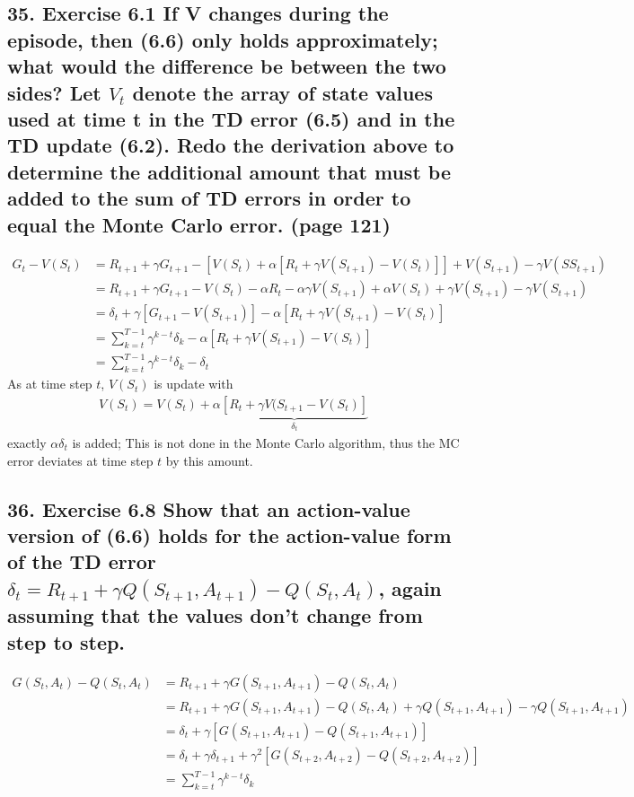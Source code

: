 \subsection*{35. Exercise 6.1 If V changes during the episode, then (6.6) only holds approximately; what would the difference be between the two sides? Let $V_t$ denote the array of state values used at time t in the TD error (6.5) and in the TD update (6.2). Redo the derivation above to determine the additional amount that must be added to the sum of TD errors in order to equal the Monte Carlo error. (page 121)}
\begin{align*}
G_t - V(S_t) &= R_{t+1} + \gamma G_{t+1} - [V(S_t) + \alpha[R_t + \gamma V(S_{t+1}) - V(S_t)]] + V(S_{t+1}) - \gamma V(S{S_{t+1}})\\
&= R_{t+1} + \gamma G_{t+1} - V(S_t) - \alpha R_t -\alpha \gamma V(S_{t+1}) + \alpha V(S_t) + \gamma V(S_{t+1}) - \gamma V(S_{t+1})\\
&= \delta_t + \gamma [G_{t+1} - V(S_{t+1})] - \alpha [R_t + \gamma V(S_{t+1}) - V(S_t)]\\
&= \sum_{k = t}^{T-1} \gamma^{k-t} \delta_k - \alpha [R_t + \gamma V(S_{t+1}) - V(S_t)] \\
&= \sum_{k = t}^{T-1} \gamma^{k-t} \delta_k  - \delta_t
\end{align*}
As at time step $t$, $V(S_t)$ is update with\\
\begin{align*}
V(S_t) = V(S_t) + \alpha \underbrace{[R_t + \gamma V(S_{t+1} - V(S_t)]}_{\delta_t}
\end{align*}
exactly $\alpha \delta_t$ is added; This is not done in the Monte Carlo algorithm, thus the MC error deviates at time step $t$ by this amount.
\subsection*{36. Exercise 6.8 Show that an action-value version of (6.6) holds for the action-value form of the TD error $\delta_t = R_{t+1} + \gamma Q(S_{t+1} , A_{t+1}) - Q(S_t , A_t )$, again assuming that the values don't change from step to step.}

\begin{align*}
G(S_t, A_t) - Q(S_t, A_t) &= R_{t+1} + \gamma G(S_{t+1}, A_{t+1}) - Q(S_t, A_t) \\
&= R_{t+1} + \gamma G(S_{t+1}, A_{t+1}) - Q(S_t, A_t) + \gamma Q(S_{t+1}, A_{t+1}) - \gamma Q(S_{t+1}, A_{t+1})\\
&= \delta_t + \gamma [G(S_{t+1}, A_{t+1}) - Q(S_{t+1}, A_{t+1})]\\
&= \delta_t + \gamma \delta_{t+1} + \gamma^2[G(S_{t+2}, A_{t+2}) - Q(S_{t+2}, A_{t+2})]\\
&= \sum_{k = t}^{T-1} \gamma ^{k-t}\delta_k
\end{align*}

